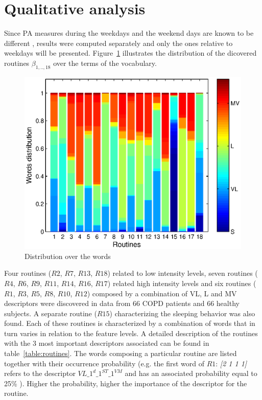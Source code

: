 \section{Qualitative analysis}
Since PA measures during the weekdays and the weekend days are known to be different \cite{Watz_2009}, results were computed separately and only the ones relative to weekdays will be presented.
Figure~\ref{fig:10} illustrates the distribution of the dicovered routines $\beta_{1,..,18}$ over the terms of the vocabulary.
\begin{figure}[ht!]
  \centering
  \includegraphics[width=.45\textwidth]{figure/eps/figure_10.eps}
  \caption[]{Distribution over the words}
  \label{fig:10}
\end{figure}
Four routines ($R2$, $R7$, $R13$, $R18$) related to low intensity levels, seven routines ($R4$, $R6$, $R9$, $R11$, $R14$, $R16$, $R17$) related high intensity levels and six routines ($R1$, $R3$, $R5$, $R8$, $R10$, $R12$) composed by a combination of VL, L and MV descriptors were discovered in data from 66 COPD patients and 66 healthy subjects. A separate routine ($R15$) characterizing the sleeping behavior was also found.
Each of these routines is characterized by a combination of words that in turn varies in relation to the feature levels. A detailed description of the routines with the 3 most important descriptors associated can be found in table~\ref{table:routines}. The words composing a particular routine are listed together with their occurrence probability (e.g. the first word of $R1$: \textit{[2 1 1 1]} refers to the descriptor \textit{$VL\_1^{d}\_1^{ST}\_1^{VM}$} and has an associated probability equal to 25\% ). Higher the probability, higher the importance of the descriptor for the routine.

%
